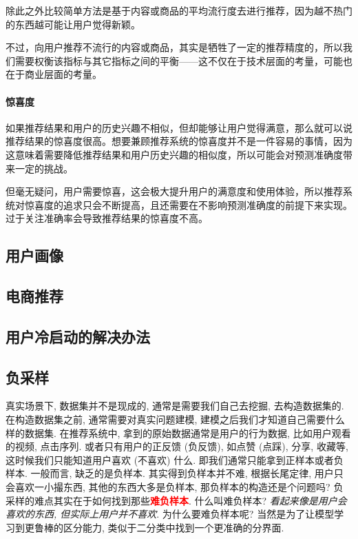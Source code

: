 除此之外比较简单方法是基于内容或商品的平均流行度去进行推荐，因为越不热门的东西越可能让用户觉得新颖。

不过，向用户推荐不流行的内容或商品，其实是牺牲了一定的推荐精度的，所以我们需要权衡该指标与其它指标之间的平衡——这不仅在于技术层面的考量，可能也在于商业层面的考量。

\paragraph{惊喜度}如果推荐结果和用户的历史兴趣不相似，但却能够让用户觉得满意，那么就可以说推荐结果的惊喜度很高。想要兼顾推荐系统的惊喜度并不是一件容易的事情，因为这意味着需要降低推荐结果和用户历史兴趣的相似度，所以可能会对预测准确度带来一定的挑战。

但毫无疑问，用户需要惊喜，这会极大提升用户的满意度和使用体验，所以推荐系统对惊喜度的追求只会不断提高，且还需要在不影响预测准确度的前提下来实现。过于关注准确率会导致推荐结果的惊喜度不高。


\subsection{用户画像}

\subsection{电商推荐}

\subsection{用户冷启动的解决办法}

\subsection{负采样}
真实场景下, 数据集并不是现成的, 通常是需要我们自己去挖掘, 去构造数据集的. 在构造数据集之前, 通常需要对真实问题建模, 建模之后我们才知道自己需要什么样的数据集. 在推荐系统中, 拿到的原始数据通常是用户的行为数据, 比如用户观看的视频, 点击序列. 或者只有用户的正反馈 (负反馈), 如点赞 (点踩), 分享, 收藏等, 这时候我们只能知道用户喜欢 (不喜欢) 什么. 即我们通常只能拿到正样本或者负样本. 一般而言, 缺乏的是负样本. 其实得到负样本并不难, 根据长尾定律, 用户只会喜欢一小撮东西, 其他的东西大多是负样本, 那负样本的构造还是个问题吗? 负采样的难点其实在于如何找到那些\textcolor{red}{\textbf{难负样本}}. 什么叫难负样本? \textit{看起来像是用户会喜欢的东西, 但实际上用户并不喜欢}. 为什么要难负样本呢? 当然是为了让模型学习到更鲁棒的区分能力, 类似于二分类中找到一个更准确的分界面.

